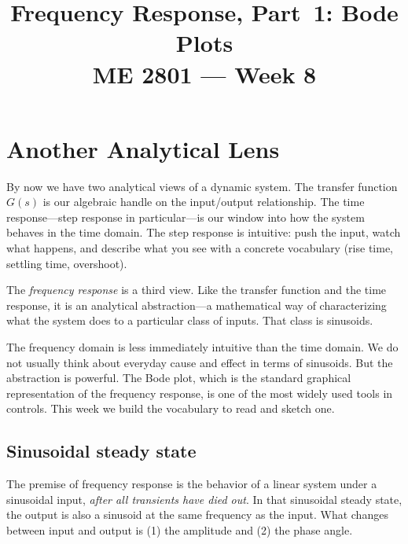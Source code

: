 \documentclass[12pt]{article}
\title{Frequency Response, Part~1: Bode Plots\\[0.5em]
\large ME 2801 --- Week 8}
\author{}
\date{}
\begin{document}
\maketitle
\tableofcontents
\newpage

\section{Another Analytical Lens}
\label{sec:intro}

By now we have two analytical views of a dynamic system.  The transfer function
$G(s)$ is our algebraic handle on the input/output relationship.  The time
response---step response in particular---is our window into how the system
behaves in the time domain.  The step response is intuitive: push the input,
watch what happens, and describe what you see with a concrete vocabulary (rise
time, settling time, overshoot).

The \emph{frequency response} is a third view.  Like the transfer function and
the time response, it is an analytical abstraction---a mathematical way of
characterizing what the system does to a particular class of inputs.  That
class is sinusoids.

The frequency domain is less immediately intuitive than the time domain.
We do not usually think about everyday cause and effect in terms of sinusoids.
But the abstraction is powerful.  The Bode plot, which is the standard graphical
representation of the frequency response, is one of the most widely used tools
in controls.  This week we build the vocabulary to read and sketch one.

\subsection{Sinusoidal steady state}
\label{sec:sinusoidal}

The premise of frequency response is the behavior of a linear system under a
sinusoidal input, \emph{after all transients have died out}.  In that sinusoidal
steady state, the output is also a sinusoid at the same frequency as the input.
What changes between input and output is (1) the amplitude and (2) the phase
angle.
\end{document}
